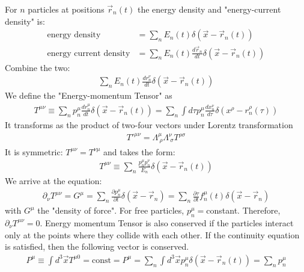 For $n$ particles at positions $\vec{r}_n (t)$ the energy density and
"energy-current density" is:
\begin{align*}
    \text{energy density} &= \sum_n E_n(t) \delta(\vec{x} - \vec{r}_n (t))
    \\
    \text{energy current density} &= \sum_n E_n (t) \frac{d \vec{r}_n}{dt} \delta(\vec{x} - \vec{r}_n (t))
\end{align*}
Combine the two:
\begin{align*}
    \sum_n E_n(t) \frac{d r^\nu_n}{dt} \delta(\vec{x} - \vec{r}_n (t))
\end{align*}
We define the "Energy-momentum Tensor" as
\begin{align*}
    T^{\mu \nu} \equiv \sum_n p_n^\mu \frac{d r_n^\mu}{dt} \delta(\vec{x} - \vec{r}_n (t))
    = \sum_n \int d \tau p_n^\mu \frac{d x_n^\nu}{d \tau} \delta(x^\rho - r_n^\rho (\tau))
\end{align*}
It transforms as the product of two-four vectors under Lorentz transformation
\begin{align*}
    T'^{\mu \nu} = \Lambda^\mu_{\ \rho} \Lambda^\nu_{\ \sigma} T^{\rho \sigma}
\end{align*}
It is symmetric: $T^{\mu \nu} = T^{\nu \mu}$ and takes the form:
\begin{align*}
    T^{\mu \nu} \equiv \sum_n \frac{p_n^\mu p_n^\nu}{E_n} \delta(\vec{x} - \vec{r}_n(t))
\end{align*}
We arrive at the equation:
\begin{align*}
    \partial_\nu T^{\mu \nu} = G^\mu =
    \sum_n \frac{\partial p_n^\mu}{\partial t} \delta(\vec{x} - \vec{r}_n)
    = \sum_n \frac{\partial \tau}{\partial t} f_n^\mu (t) \delta(\vec{x} - \vec{r}_n)
\end{align*}
with $G^\mu$ the "density of force". For free particles, $p_n^\mu =$constant.
Therefore, $\partial_\nu T^{\mu \nu} = 0$. Energy momentum Tensor is also conserved
if the particles interact only at the points where they collide with each other.
If the continuity equation is satisfied, then the following vector is conserved.
\begin{align*}
    P^\mu \equiv \int d^3 \vec{x} T^{\mu 0} = \text{const}
    =
    P^\mu = \sum_n \int d^3 \vec{x} p_n^\mu \delta(\vec{x} - \vec{r}_n (t))
    = \sum_n p_n^\mu
\end{align*}
